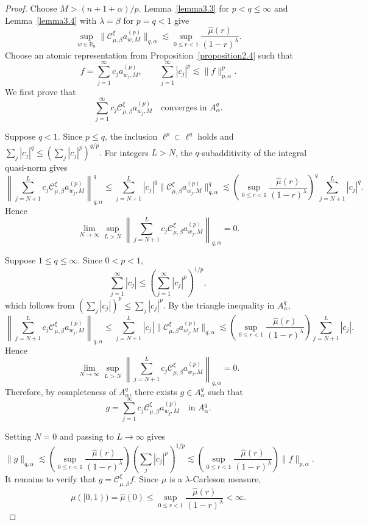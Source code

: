 \documentclass[preprint,12pt,times]{elsarticle}
\theoremstyle{definition}
\theoremstyle{remark}
\numberwithin{equation}{section}
\begin{document}
\begin{proof}
Choose \(M>(n+1+\alpha)/p\). Lemma~\ref{lemma3.3}
for \(p<q\le\infty\) and Lemma~\ref{lemma3.4} with
\(\lambda=\beta\) for \(p=q<1\) give
\[
  \sup_{w\in\mathbb B_n}
  \|\mathcal C_{\mu,\beta}^{\xi}a_{w,M}^{(p)}\|_{q,\alpha}
  \lesssim
  \sup_{0\le r<1}
  \frac{\widehat\mu(r)}{(1-r)^\lambda}.
\]
Choose an atomic representation from
Proposition~\ref{proposition2.4} such that
\[
  f=\sum_{j=1}^\infty c_ja_{w_j,M}^{(p)},
  \qquad
  \sum_{j=1}^\infty|c_j|^p
  \lesssim\|f\|_{p,\alpha}^p.
\]
We first prove that
\[
  \sum_{j=1}^\infty c_j\mathcal C_{\mu,\beta}^{\xi}a_{w_j,M}^{(p)}
  \quad\text{converges in }A_\alpha^q.
\]

Suppose \(q<1\). Since \(p\le q\), the inclusion
\(\ell^p\subset\ell^q\) holds and
\(
 \sum_j|c_j|^q
 \le(\sum_j|c_j|^p)^{q/p}.
\)
For integers \(L>N\), the \(q\)-subadditivity of the integral
quasi-norm gives
\[
  \left\|\sum_{j=N+1}^Lc_j\mathcal C_{\mu,\beta}^{\xi}a_{w_j,M}^{(p)}\right\|_{q,\alpha}^q
  \le \sum_{j=N+1}^L|c_j|^q\|\mathcal C_{\mu,\beta}^{\xi}a_{w_j,M}^{(p)}\|_{q,\alpha}^q
  \lesssim \left(\sup_{0\le r<1}\frac{\widehat\mu(r)}{(1-r)^\lambda}\right)^q\sum_{j=N+1}^L|c_j|^q.
\]
Hence
\[
  \lim_{N\to\infty}\sup_{L>N}\left\|\sum_{j=N+1}^Lc_j\mathcal C_{\mu,\beta}^{\xi}a_{w_j,M}^{(p)}\right\|_{q,\alpha}=0.
\]

Suppose \(1\le q\le\infty\). Since \(0<p<1\),
\[
  \sum_{j=1}^\infty|c_j|
  \le
  \left(\sum_{j=1}^\infty|c_j|^p\right)^{1/p},
\]
which follows from
\((\sum_j|c_j|)^p\le\sum_j|c_j|^p\). By the triangle inequality in
\(A_\alpha^q\),
\[
  \left\|\sum_{j=N+1}^Lc_j\mathcal C_{\mu,\beta}^{\xi}a_{w_j,M}^{(p)}\right\|_{q,\alpha}
  \le \sum_{j=N+1}^L|c_j|\|\mathcal C_{\mu,\beta}^{\xi}a_{w_j,M}^{(p)}\|_{q,\alpha}
  \lesssim \left(\sup_{0\le r<1}\frac{\widehat\mu(r)}{(1-r)^\lambda}\right)\sum_{j=N+1}^L|c_j|.
\]
Hence
\[
  \lim_{N\to\infty}\sup_{L>N}\left\|\sum_{j=N+1}^Lc_j\mathcal C_{\mu,\beta}^{\xi}a_{w_j,M}^{(p)}\right\|_{q,\alpha}=0.
\]
Therefore, by completeness of \(A_\alpha^q\), there exists \(g\in A_\alpha^q\) such that
\[
  g=\sum_{j=1}^\infty c_j\mathcal C_{\mu,\beta}^{\xi}a_{w_j,M}^{(p)}
  \quad\text{in }A_\alpha^q.
\]

Setting \(N=0\) and passing to \(L\to\infty\) gives
\[
  \|g\|_{q,\alpha}
  \lesssim
  \left(
    \sup_{0\le r<1}
    \frac{\widehat\mu(r)}{(1-r)^\lambda}
  \right)
  \left(\sum_j|c_j|^p\right)^{1/p}
  \lesssim
  \left(
    \sup_{0\le r<1}
    \frac{\widehat\mu(r)}{(1-r)^\lambda}
  \right)
  \|f\|_{p,\alpha}.
\]
It remains to verify that \(g=\mathcal C_{\mu,\beta}^{\xi}f\). Since \(\mu\) is a
\(\lambda\)-Carleson measure, 
\[
  \mu([0,1))=\widehat\mu(0)\le \sup_{0\le r<1}\frac{\widehat\mu(r)}{(1-r)^\lambda}<\infty.
\]


\end{proof}
\end{document}
